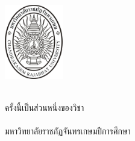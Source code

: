 \makeatletter
\clearpage\pagestyle{empty}
	{\centering
	\fontsize{16}{18.4}\selectfont
		\includegraphics[width=1in]{CRU_LOGO/CRU_Chandra}\\\vspace{\baselineskip}
		\bfseries\@thesistitleThai\\
		\bfseries\@thesistitle
	\vfill
	\fontsize{14}{16.1}\selectfont 
	
	\@authorThai
	\vfill

	\fontsize{13.1}{16.1}\selectfont
	\@typeofwritingThai ครั้งนี้เป็นส่วนหนึ่งของวิชา\@researchsubjectThai\\
	\ifdefined\@degreeThai \@degreeThai\space\fi \ifdefined\@majorThai \@majorThai\space\fi \@facultyThai 
	\\มหาวิทยาลัยราชภัฏจันทรเกษม\space ปีการศึกษา \the\year
	\par}


\cleardoublepage
\newpage


